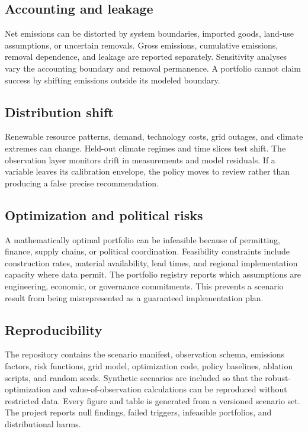 \documentclass[conference]{IEEEtran}
\begin{document}
\subsection{Accounting and leakage}
Net emissions can be distorted by system boundaries, imported goods, land-use assumptions, or uncertain removals. Gross emissions, cumulative emissions, removal dependence, and leakage are reported separately. Sensitivity analyses vary the accounting boundary and removal permanence. A portfolio cannot claim success by shifting emissions outside its modeled boundary.

\subsection{Distribution shift}
Renewable resource patterns, demand, technology costs, grid outages, and climate extremes can change. Held-out climate regimes and time slices test shift. The observation layer monitors drift in measurements and model residuals. If a variable leaves its calibration envelope, the policy moves to review rather than producing a false precise recommendation.

\subsection{Optimization and political risks}
A mathematically optimal portfolio can be infeasible because of permitting, finance, supply chains, or political coordination. Feasibility constraints include construction rates, material availability, lead times, and regional implementation capacity where data permit. The portfolio registry reports which assumptions are engineering, economic, or governance commitments. This prevents a scenario result from being misrepresented as a guaranteed implementation plan.

\subsection{Reproducibility}
The repository contains the scenario manifest, observation schema, emissions factors, risk functions, grid model, optimization code, policy baselines, ablation scripts, and random seeds. Synthetic scenarios are included so that the robust-optimization and value-of-observation calculations can be reproduced without restricted data. Every figure and table is generated from a versioned scenario set. The project reports null findings, failed triggers, infeasible portfolios, and distributional harms.
\end{document}
